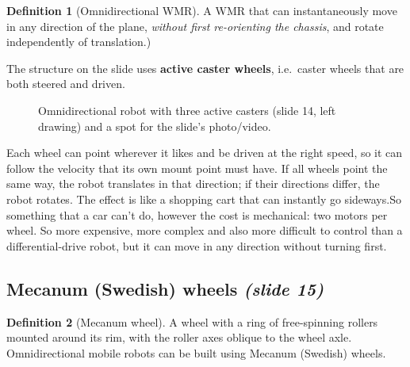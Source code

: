 \documentclass[11pt,a4paper]{article}
\newcommand{\casterwheel}[2]{\begin{scope}[shift={(#1)},rotate=#2]
  \draw (0,0)--(-0.4,0); \draw[fill=white] (-0.6,-0.06) rectangle (-0.2,0.06);
  \fill (0,0) circle (1.5pt);\end{scope}}
\theoremstyle{definition}
\newtheorem{definition}{Definition}[section]
\theoremstyle{plain}
\theoremstyle{remark}
\begin{document}
\begin{definition}[Omnidirectional WMR]
A WMR that can instantaneously move in any direction of the plane, \emph{without first re-orienting the chassis}, and rotate independently of translation.)
\end{definition}

The structure on the slide uses \textbf{active caster wheels}, i.e.\ caster wheels that are both steered and driven.

\begin{figure}[H]
\centering
{}
\caption{Omnidirectional robot with three active casters (slide 14, left drawing) and a spot for the slide's photo/video.}
\end{figure}

\begin{intuition}
Each wheel can point wherever it likes and be driven at the right speed, so it can follow the velocity that its own mount point must have. If all wheels point the same way, the robot translates in that direction; if their directions differ, the robot rotates. The effect is like a shopping cart that can instantly go sideways.So something that a car can't do, however the cost is mechanical: two motors per wheel. So more expensive, more complex and also more difficult to control than a differential-drive robot, but it can move in any direction without turning first.
\end{intuition}

\subsection{Mecanum (Swedish) wheels \emph{(slide 15)}}

\begin{definition}[Mecanum wheel]
A wheel with a ring of free-spinning rollers mounted around its rim, with the roller axes oblique to the wheel axle. Omnidirectional mobile robots can be built using Mecanum (Swedish) wheels.
\end{definition}
\end{document}
